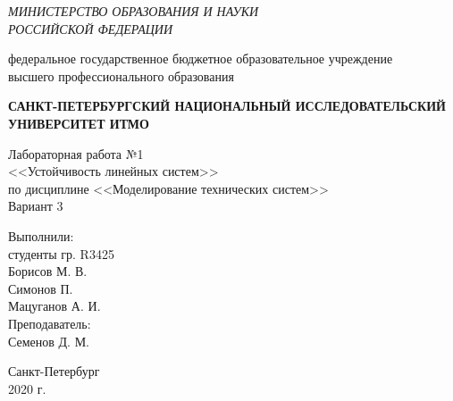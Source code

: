 \begin{titlepage}
    \begin{center}
        \textit{МИНИСТЕРСТВО ОБРАЗОВАНИЯ И НАУКИ\\
        РОССИЙСКОЙ ФЕДЕРАЦИИ}
        \vspace{1ex}

        федеральное государственное бюджетное образовательное учреждение\\
        высшего профессионального образования
        \vspace{1ex}

        \textbf{САНКТ-ПЕТЕРБУРГСКИЙ НАЦИОНАЛЬНЫЙ ИССЛЕДОВАТЕЛЬСКИЙ УНИВЕРСИТЕТ ИТМО}
        \vspace{13ex}

        Лабораторная работа №1\\
        <<Устойчивость линейных систем>>\\
        по дисциплине <<Моделирование технических систем>>\\
        \vspace{1em}
        Вариант 3\\
    \end{center}
    \vspace{14em}
    \begin{flushright}
        \noindent
        Выполнили:\\
        студенты гр. R3425\\
        Борисов М. В.\\
        Симонов П.\\
        Мацуганов А. И.\\
        \vspace{1em}
        Преподаватель:\\
        Семенов Д. М.
    \end{flushright}
    \vfill
    \begin{center}
        \large{Санкт-Петербург}\\
        2020 г.\\
    \end{center}
\end{titlepage}
